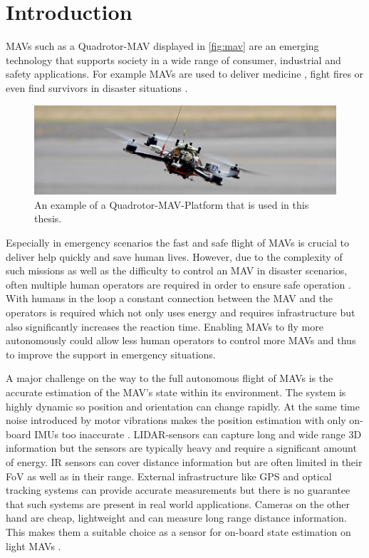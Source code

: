 \chapter{Introduction}
\label{sec:intro}
\acresetall
\acp{MAV} such as a Quadrotor-\ac{MAV} displayed in \autoref{fig:mav} are an emerging technology that supports society in a wide range of consumer, industrial and safety applications. For example \acp{MAV} are used to deliver medicine \cite{Shankland2018}, fight fires \cite{KateBaggaley2017} or even find survivors in disaster situations \cite{JoshuaBateman2017}.

\begin{figure}[b]
	\centering
	\includegraphics[width=\textwidth]{fig/mav}
	\caption{An example of a Quadrotor-\ac{MAV}-Platform that is used in this thesis.}
	\label{fig:mav}
\end{figure}

Especially in emergency scenarios the fast and safe flight of \acp{MAV} is crucial to deliver help quickly and save human lives. However, due to the complexity of such missions as well as the difficulty to control an \ac{MAV} in disaster scenarios, often multiple human operators are required in order to ensure safe operation \cite{Murphy2016}. With humans in the loop a constant connection between the \ac{MAV} and the operators is required which not only uses energy and requires infrastructure but also significantly increases the reaction time. Enabling \acp{MAV} to fly more autonomously could allow less human operators to control more \acp{MAV} and thus to improve the support in emergency situations.

A major challenge on the way to the full autonomous flight of \acp{MAV} is the accurate estimation of the \ac{MAV}'s state within its environment. The system is highly dynamic so position and orientation can change rapidly. At the same time noise introduced by motor vibrations makes the position estimation with only on-board \acp{IMU} too inaccurate \cite{Mohamed2014}. \ac{LIDAR}-sensors can capture long and wide range 3D information but the sensors are typically heavy and require a significant amount of energy. \ac{IR} sensors can cover distance information but are often limited in their \ac{FoV} as well as in their range. External infrastructure like \ac{GPS} and optical tracking systems can provide accurate measurements but there is no guarantee that such systems are present in real world applications. Cameras on the other hand are cheap, lightweight and can measure long range distance information. This makes them a suitable choice as a sensor for on-board state estimation on light \acp{MAV} \cite{Elbanhawi2017}.

